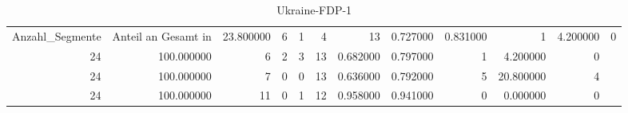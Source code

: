 \begin{table}
\caption{Ukraine-FDP-1}
\label{tab:meine_tabelle}
\begin{tabular}{rrrrrrrrrrr}
\toprule
Anzahl_Segmente & Anteil an Gesamt in %
 & 23.800000 & 6 & 1 & 4 & 13 & 0.727000 & 0.831000 & 1 & 4.200000 & 0 \\
24 & 100.000000 & 6 & 2 & 3 & 13 & 0.682000 & 0.797000 & 1 & 4.200000 & 0 \\
24 & 100.000000 & 7 & 0 & 0 & 13 & 0.636000 & 0.792000 & 5 & 20.800000 & 4 \\
24 & 100.000000 & 11 & 0 & 1 & 12 & 0.958000 & 0.941000 & 0 & 0.000000 & 0 \\
\bottomrule
\end{tabular}
\end{table}
